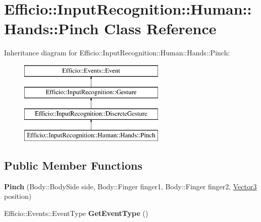 \hypertarget{class_efficio_1_1_input_recognition_1_1_human_1_1_hands_1_1_pinch}{}\section{Efficio\+:\+:Input\+Recognition\+:\+:Human\+:\+:Hands\+:\+:Pinch Class Reference}
\label{class_efficio_1_1_input_recognition_1_1_human_1_1_hands_1_1_pinch}
Inheritance diagram for Efficio\+:\+:Input\+Recognition\+:\+:Human\+:\+:Hands\+:\+:Pinch\+:\begin{figure}[H]
\begin{center}
\leavevmode
\includegraphics[height=4.000000cm]{class_efficio_1_1_input_recognition_1_1_human_1_1_hands_1_1_pinch}
\end{center}
\end{figure}
\subsection*{Public Member Functions}
\begin{DoxyCompactItemize}
\item 
\hypertarget{class_efficio_1_1_input_recognition_1_1_human_1_1_hands_1_1_pinch_a8471ee0196227f2c491925955449f534}{}\label{class_efficio_1_1_input_recognition_1_1_human_1_1_hands_1_1_pinch_a8471ee0196227f2c491925955449f534} 
{\bfseries Pinch} (Body\+::\+Body\+Side side, Body\+::\+Finger finger1, Body\+::\+Finger finger2, \hyperlink{class_efficio_1_1_vector3}{Vector3} position)
\item 
\hypertarget{class_efficio_1_1_input_recognition_1_1_human_1_1_hands_1_1_pinch_a579897e092310066f9dab8df222fc863}{}\label{class_efficio_1_1_input_recognition_1_1_human_1_1_hands_1_1_pinch_a579897e092310066f9dab8df222fc863} 
Efficio\+::\+Events\+::\+Event\+Type {\bfseries Get\+Event\+Type} ()
\end{DoxyCompactItemize}
